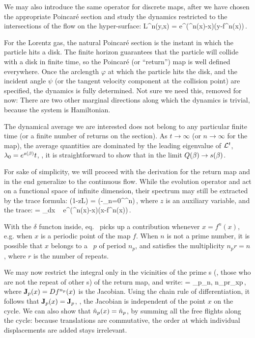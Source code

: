 We may also introduce the same operator for discrete maps, after we
have chosen the appropriate Poincar\'e section and study the dynamics
restricted to the intersections of the flow on the hyper-surface:
\beq
{\cal L}^n(y,x) = e^{\beta\cdot(^n(x)-x)}\delta(y-f^n(x))\,.
\label{eq-evo-map}
\eeq

For the Lorentz gas, the natural Poincar\'e section is the instant in
which the particle hits a disk. The finite horizon guarantees that the particle
will collide with a disk in finite time, so the Poincar\'e (or ``return'') map is
well defined everywhere. Once the arclength $\varphi$ at which the particle
hits the disk, and the incident angle $\psi$ (or the tangent velocity component
at the collision point) are specified, the dynamics is fully determined.
     {
    Not sure we need this, removed for now:
There are two other marginal directions along which the dynamics is trivial,
because the system is Hamiltonian.
    }

The dynamical average we are interested does not belong to any
particular finite time (or a finite number of returns on the section). As
$t\to\infty$ (or $n\to\infty$ for the map), the average quantities are
dominated by the leading eigenvalue of ${\cal L}^t$, $\lambda_0 =
e^{s(\beta)}t$, \ie, it is straightforward to show that in the
limit $Q(\beta) \to s(\beta)$.

For sake of simplicity, we will proceed with the derivation for the
return map and in the end generalize to the continuous flow. While the
evolution operator  and  act on
a functional space of infinite dimension, their spectrum may still be
extracted by the trace formula:
\beq
\det(1-z{\cal L}) =
\exp\left(-\sum_{n=0}^{\infty}^n\right)\,,
\label{eq-det-disc-def}
\eeq
where $z$ is an auxiliary variable, and the trace:
\beq
{} = \int_{\pS}dx ~
e^{\beta\cdot(^n(x)-x)}\delta(x-f^n(x))\,.
\label{eq-trace-disc}
\eeq

With the $\delta$ functon inside, eq.~ picks up a
contribution whenever $x = f^n(x)$, e.g. when $x$ is a periodic point
of the map $f$. When $n$ is not a prime number, it is possible that
$x$ belongs to a \po\ $p$ of period $n_p$, and satisfies the
multiplicity $n_p r = n$, where $r$ is the number of repeats.

We may now restrict the integral only in the vicinities of the prime
\po s (\ie, those who are not the repeat of other \po s) of the return map, and write:
\beq
{} = \sum_p\delta_{n,
n_pr}\sum_{x\in p}\,,
\label{eq-trace-expan}
\eeq
where ${\bf J}_p(x) = Df^{n_p}(x)$ is the Jacobian. Using the chain
rule of differentiation, it follows that ${\bf J}_p(x) = {\bf J}_p $,
\ie, the Jacobian is independent of the point $x$ on the cycle. We
can also show that $\hat{n}_p(x) = \hat{n}_p$, by summing all the free
flights along the cycle: because translations are commutative, the
order at which individual displacements are added stays irrelevant.

